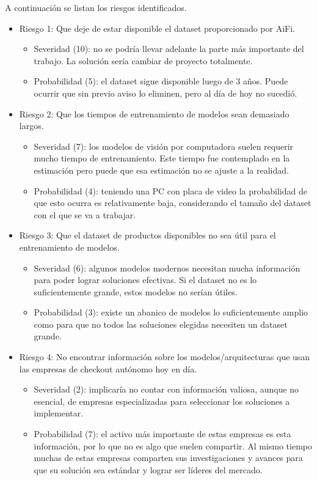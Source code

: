 \documentclass[
11pt, %
]{charter}
\begin{document}
A continuación se listan los riesgos identificados.

\begin{itemize}
\item Riesgo 1: Que deje de estar disponible el dataset proporcionado por AiFi.
\begin{itemize}
\item Severidad (10): no se podría llevar adelante la parte más importante del trabajo. La solución sería cambiar de proyecto totalmente.
\item Probabilidad (5): el dataset sigue disponible luego de 3 años. Puede ocurrir que sin previo aviso lo eliminen, pero al día de hoy no sucedió.
\end{itemize}
\item Riesgo 2: Que los tiempos de entrenamiento de modelos sean demasiado largos.
\begin{itemize}
\item Severidad (7): los modelos de visión por computadora suelen requerir mucho tiempo de entrenamiento. Este tiempo fue contemplado en la estimación pero puede que esa estimación no se ajuste a la realidad.
\item Probabilidad (4): teniendo una PC con placa de video la probabilidad de que esto ocurra es relativamente baja, considerando el tamaño del dataset con el que se va a trabajar.
\end{itemize}
\item Riesgo 3: Que el dataset de productos disponibles no sea útil para el entrenamiento de modelos.
\begin{itemize}
\item Severidad (6): algunos modelos modernos necesitan mucha información para poder lograr soluciones efectivas. Si el dataset no es lo suficientemente grande, estos modelos no serían útiles.
\item Probabilidad (3): existe un abanico de modelos lo suficientemente amplio como para que no todos las soluciones elegidas necesiten un dataset grande.
\end{itemize}
\item Riesgo 4: No encontrar información sobre los modelos/arquitecturas que usan las empresas de checkout autónomo hoy en día.
\begin{itemize}
\item Severidad (2): implicaría no contar con información valiosa, aunque no esencial, de empresas especializadas para seleccionar los soluciones a implementar. 
\item Probabilidad (7): el activo más importante de estas empresas es esta información, por lo que no es algo que suelen compartir. Al mismo tiempo muchas de estas empresas comparten sus investigaciones y avances para que su solución sea estándar y lograr ser líderes del mercado.

\end{itemize}
\end{itemize}
\end{document}
